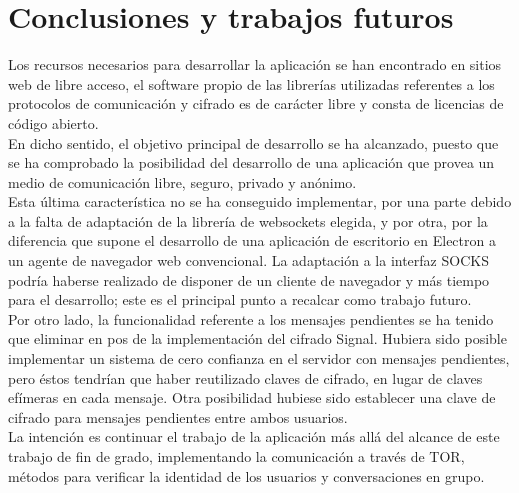\chapter{Conclusiones y trabajos futuros} \label{chap:conclusiones}

Los recursos necesarios para desarrollar la aplicación se han encontrado en sitios web de libre acceso, el software propio de las librerías utilizadas referentes a los protocolos de comunicación y cifrado es de carácter libre y consta de licencias de código abierto. \\

En dicho sentido, el objetivo principal de desarrollo se ha alcanzado, puesto que se ha comprobado la posibilidad del desarrollo de una aplicación que provea un medio de comunicación libre, seguro, privado y anónimo. \\ 

Esta última característica no se ha conseguido implementar, por una parte debido a la falta de adaptación de la librería de websockets elegida, y por otra, por la diferencia que supone el desarrollo de una aplicación de escritorio en Electron a un agente de navegador web convencional. La adaptación a la interfaz SOCKS podría haberse realizado de disponer de un cliente de navegador y más tiempo para el desarrollo; este es el principal punto a recalcar como trabajo futuro. \\

Por otro lado, la funcionalidad referente a los mensajes pendientes se ha tenido que eliminar en pos de la implementación del cifrado Signal. Hubiera sido posible implementar un sistema de cero confianza en el servidor con mensajes pendientes, pero éstos tendrían que haber reutilizado claves de cifrado, en lugar de claves efímeras en cada mensaje. Otra posibilidad hubiese sido establecer una clave de cifrado para mensajes pendientes entre ambos usuarios. \\

La intención es continuar el trabajo de la aplicación más allá del alcance de este trabajo de fin de grado, implementando la comunicación a través de TOR, métodos para verificar la identidad de los usuarios y conversaciones en grupo. \\